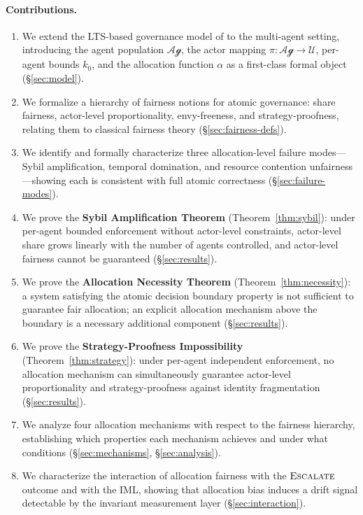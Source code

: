 \documentclass[11pt]{article}
\theoremstyle{plain}
\theoremstyle{definition}
\theoremstyle{remark}
\newcommand{\Escalate}{\textsc{Escalate}}
\newcommand{\Agents}{\mathcal{Ag}}         %
\newcommand{\Actors}{\mathcal{U}}          %
\newcommand{\kbound}{k_0}                  %
\newcommand{\alloc}{\alpha}                %
\newcommand{\owner}{\pi}                   %
\begin{document}
\paragraph{Contributions.}
\begin{enumerate}[label=\normalfont(\roman*)]
  \item We extend the LTS-based governance model of
    \citet{fernandez2026a} to the multi-agent setting, introducing
    the agent population $\Agents$, the actor mapping $\owner :
    \Agents \to \Actors$, per-agent bounds $\kbound$, and the
    allocation function $\alloc$ as a first-class formal object
    (\S\ref{sec:model}).

  \item We formalize a hierarchy of fairness notions for atomic
    governance: share fairness, actor-level proportionality,
    envy-freeness, and strategy-proofness, relating them to
    classical fairness theory (\S\ref{sec:fairness-defs}).

  \item We identify and formally characterize three allocation-level
    failure modes---Sybil amplification, temporal domination, and
    resource contention unfairness---showing each is consistent with
    full atomic correctness (\S\ref{sec:failure-modes}).

  \item We prove the \textbf{Sybil Amplification Theorem}
    (Theorem~\ref{thm:sybil}): under per-agent bounded enforcement
    without actor-level constraints, actor-level share grows linearly
    with the number of agents controlled, and actor-level fairness
    cannot be guaranteed (\S\ref{sec:results}).

  \item We prove the \textbf{Allocation Necessity Theorem}
    (Theorem~\ref{thm:necessity}): a system satisfying the atomic
    decision boundary property is not sufficient to guarantee
    fair allocation; an explicit allocation mechanism above the
    boundary is a necessary additional component (\S\ref{sec:results}).

  \item We prove the \textbf{Strategy-Proofness Impossibility}
    (Theorem~\ref{thm:strategy}): under per-agent independent
    enforcement, no allocation mechanism can simultaneously guarantee
    actor-level proportionality and strategy-proofness against identity
    fragmentation (\S\ref{sec:results}).

  \item We analyze four allocation mechanisms with respect to the
    fairness hierarchy, establishing which properties each mechanism
    achieves and under what conditions (\S\ref{sec:mechanisms},
    \S\ref{sec:analysis}).

  \item We characterize the interaction of allocation fairness with the
    $\Escalate$ outcome and with the IML, showing that allocation bias
    induces a drift signal detectable by the invariant measurement layer
    (\S\ref{sec:interaction}).
\end{enumerate}
\end{document}
